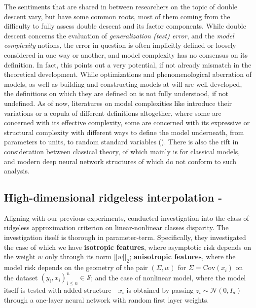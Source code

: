 \documentclass[
  journal=largetwo,
  year=2025,
  volume=37,
]{cup-journal}
\begin{document}
The sentiments that are shared in between researchers on the topic of double descent vary, but have some common roots, most of them coming from the difficulty to fully assess double descent and its factor components. While double descent concerns the evaluation of \textit{generalization (test) error}, and the \textit{model complexity} notions, the error in question is often implicitly defined or loosely considered in one way or another, and model complexity has no consensus on its definition. In fact, this points out a very potential, if not already mismatch in the theoretical development. While optimizations and phenomenological aberration of models, as well as building and constructing models at will are well-developed, the definitions on which they are defined on is not fully understood, if not undefined. As of now, literatures on model complexities like \cite{modelcomplex_exp,hu_model_2021,janik2021complexitydeepneuralnetworks,truong2025rademachercomplexitybasedgeneralizationbounds,luo2024investigatingimpactmodelcomplexity} introduce their variations or a copula of different definitions altogether, where some are concerned with its effective complexity, some are concerned with its expressive or structural complexity with different ways to define the model underneath, from parameters to units, to random standard variables (\cite{neal2018modern}). There is also the rift in consideration between classical theory, of which mainly is for classical models, and modern deep neural network structures of which do not conform to such analysis.

\subsection{High-dimensional ridgeless interpolation - \cite{hastie2019surprises}}
Aligning with our previous experiments, \cite{hastie2019surprises} conducted investigation into the class of ridgeless approximation criterion on linear-nonlinear classes disparity. The investigation itself is thorough in parameter-term. Specifically, they investigated the case of which we have \textbf{isotropic features}, where asymptotic risk depends on the weight $w$ only through its norm $||w||_{2}$; \textbf{anisotropic features}, where the model risk depends on the geometry of the pair $(\Sigma, w)$ for $\Sigma = \mathrm{Cov}(x_{i})$ on the dataset $(y_{i},x_{i})^{n}_{i\leq n}\in\mathcal{S}$; and the case of nonlinear model, where the model itself is tested with added structure - $x_{i}$ is obtained by passing $z_{i}\sim\mathcal{N}(0,I_d)$ through a one-layer neural network with random first layer weights.  
\end{document}
